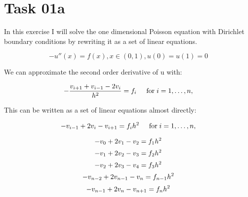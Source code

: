 \section{Task 01a}
In this exercise I will solve the one dimensional Poisson equation with Dirichlet boundary conditions by rewriting it as a set of linear equations. 

\begin{equation}
	-u''(x) = f(x),  x\in (0,1), u(0)=u(1)=0
\end{equation}

We can approximate the second order derivative of u with:

\begin{equation*}
   -\frac{v_{i+1}+v_{i-1}-2v_i}{h^2} = f_i  \hspace{0.5cm} \mathrm{for} \hspace{0.1cm} i=1,\dots, n,
\end{equation*}

This can be written as a set of linear equations almost directly:

\begin{equation*}
   -v_{i-1}+2v_i-v_{i+1} = f_i h^2  \hspace{0.5cm} \mathrm{for} \hspace{0.1cm} i=1,\dots, n,
\end{equation*}

\begin{equation*}
   -v_{0}+2v_1-v_{2} = f_1 h^2\\
\end{equation*}
\begin{equation*}
   -v_{1}+2v_2-v_{3} = f_2 h^2\\
\end{equation*}
\begin{equation*}
   -v_{2}+2v_3-v_{4} = f_3 h^2\\
\end{equation*}
\begin{equation*}
   -v_{n-2}+2v_{n-1}-v_{n} = f_{n-1} h^2\\
\end{equation*}
\begin{equation*}
   -v_{n-1}+2v_n-v_{n+1} = f_n h^2\\
\end{equation*}

